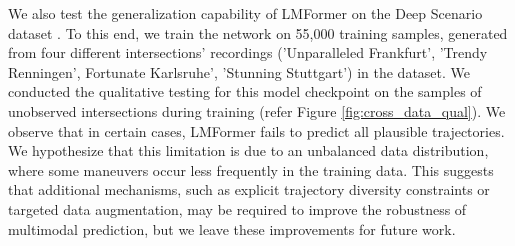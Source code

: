 We also test the generalization capability of LMFormer on the Deep Scenario dataset \cite{lu2023deepscenario}. To this end, we train the network on 55,000 training samples, generated from four different intersections' recordings ('Unparalleled Frankfurt', 'Trendy Renningen', Fortunate Karlsruhe', 'Stunning Stuttgart') in the dataset. We conducted the qualitative testing for this model checkpoint on the samples of unobserved intersections during training (refer Figure \ref{fig:cross_data_qual}). We observe that in certain cases, LMFormer fails to predict all plausible trajectories. We hypothesize that this limitation is due to an unbalanced data distribution, where some maneuvers occur less frequently in the training data. This suggests that additional mechanisms, such as explicit trajectory diversity constraints or targeted data augmentation, may be required to improve the robustness of multimodal prediction, but we leave these improvements for future work.

